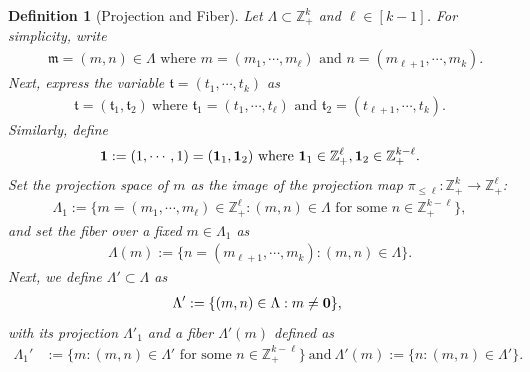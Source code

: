 \documentclass[10pt,a4paper]{amsart}
\newtheorem{definition}{Definition}\numberwithin{definition}{section}
\numberwithin{equation}{section}
\begin{document}
\begin{definition}[Projection and Fiber]\label{diid}
Let $\Lambda\subset \mathbb{Z}_+^k$ and $\ell \in [k-1]$. For simplicity,   write
\begin{align*}
& \mathfrak{m}=(m,n)\in \Lambda \text{ where $m=(m_1,\cdots,m_\ell)$ and $n=(m_{\ell+1},\cdots,m_k)$.} 
\end{align*}
Next, express the variable $\mathfrak{t}=(t_1,\cdots,t_k)$ as
\begin{align*}
\mathfrak{t}=(\mathfrak{t}_1, \mathfrak{t}_2)\ \text{where $\mathfrak{t}_1=(t_1,\cdots,t_\ell)$ and $\mathfrak{t}_2=(t_{\ell+1},\cdots,t_k)$}.
\end{align*}
Similarly, define
$${\bf 1}:=(1,\cdots,1)=({\bf 1}_1,{\bf 1}_2)\ \text{where}\ {\bf 1}_1\in \mathbb{Z}_+^\ell,{\bf 1}_2\in \mathbb{Z}_{+}^{k-\ell}. $$
Set  the projection space of $m$ as the image of the projection map $\pi_{\le \ell}:\mathbb{Z}_{+}^k\rightarrow \mathbb{Z}_{+}^{\ell}$:
\begin{align}\label{11pp}
\Lambda_{1}:=\{m=(m_1,\cdots,m_\ell) \in \mathbb{Z}_+^{\ell}:(m,n)\in \Lambda\text{ for some } n\in\mathbb{Z}_{+}^{k-\ell}\}, 
\end{align}
and set the fiber over a fixed $m\in \Lambda_{1}$ as 
\begin{align*}
\Lambda(m):=\{n=(m_{\ell+1},\cdots,m_k):  (m,n)\in \Lambda\}.
\end{align*}
Next, we  define $\Lambda'\subset\Lambda$ as
\begin{align} \label{desi1}
\Lambda':=  
\{ (m,n)\in\Lambda: m\ne {\bf 0}\}, \  
\end{align}
with its projection 
  $\Lambda'_{1}$ and a fiber $\Lambda'(m)$ defined as \begin{align*}
	\Lambda_{1}' &:=\{m: (m,n)\in \Lambda' \text{ for some } n\in\mathbb{Z}_{+}^{k-\ell}\} \ \text{and}\ \Lambda'(m):= \{ n: (m,n)\in \Lambda' \}.
\end{align*} 
\end{definition}
\end{document}
